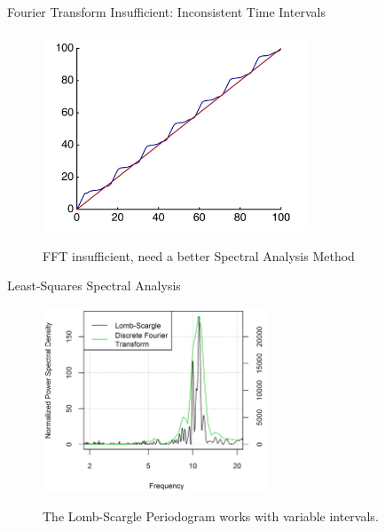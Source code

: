 \documentclass{beamer}
\begin{document}
\begin{frame}{Fourier Transform Insufficient: Inconsistent Time Intervals}
  \begin{figure}
    \centering
    \includegraphics[width = 0.7\textwidth]{./images/lintimevsactualtime.jpg}

    FFT insufficient, need a better Spectral Analysis Method
  \end{figure}
\end{frame}

\begin{frame}{Least-Squares Spectral Analysis}
  \begin{figure}
    \centering
    \includegraphics[width = 0.6\textwidth]{./pictures/lomb_vs_FFT.png}

    The Lomb-Scargle Periodogram works with variable intervals.
  \end{figure}
\end{frame}
\end{document}
